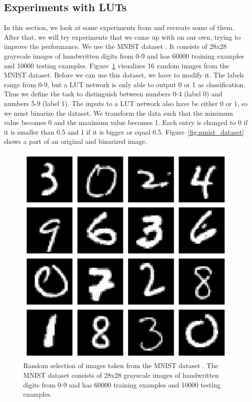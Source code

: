 \subsection{Experiments with LUTs}
In this section, we look at some experiments from \cite{bib:chatterjee2018learning} and recreate some of them. After that, we will try experiments that we came up with on our own, trying to improve the performance. We use the MNIST dataset \cite{bib:mnist}. It consists of 28x28 grayscale images of handwritten digits from 0-9 and has 60000 training examples and 10000 testing examples. Figure~\ref{fig:mnist} visualizes 16 random images from the MNIST dataset. Before we can use this dataset, we have to modify it. The labels range from 0-9, but a LUT network is only able to output 0 or 1 as classification. Thus we define the task to distinguish between numbers 0-4 (label 0) and numbers 5-9 (label 1). The inputs to a LUT network also have be either 0 or 1, so we must binarize the dataset. We transform the data such that the minimum value becomes 0 and the maximum value becomes 1. Each entry is changed to 0 if it is smaller than 0.5 and 1 if it is bigger or equal 0.5. Figure~\ref{fig:mnist_dataset} shows a part of an original and binarized image.

\begin{figure}[!htb]
    \centering
      \includegraphics[width=.6\linewidth]{images/mnist.pdf}
      \caption{Random selection of images taken from the MNIST dataset \cite{bib:mnist}. The MNIST dataset consists of 28x28 grayscale images of handwritten digits from 0-9 and has 60000 training examples and 10000 testing examples.}
\label{fig:mnist}
\end{figure}
\FloatBarrier

